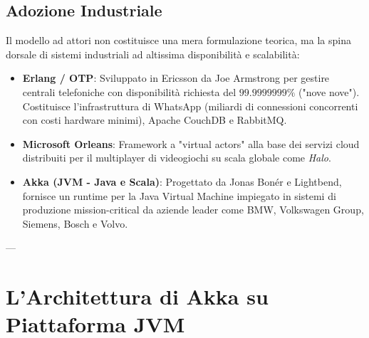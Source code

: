 \subsection{Adozione Industriale}
Il modello ad attori non costituisce una mera formulazione teorica, ma la spina dorsale di sistemi industriali ad altissima disponibilità e scalabilità:
\begin{itemize}
    \item \textbf{Erlang / OTP}: Sviluppato in Ericsson da Joe Armstrong per gestire centrali telefoniche con disponibilità richiesta del $99.9999999\%$ ("nove nove"). Costituisce l'infrastruttura di WhatsApp (miliardi di connessioni concorrenti con costi hardware minimi), Apache CouchDB e RabbitMQ.
    \item \textbf{Microsoft Orleans}: Framework a "virtual actors" alla base dei servizi cloud distribuiti per il multiplayer di videogiochi su scala globale come \textit{Halo}.
    \item \textbf{Akka (JVM - Java e Scala)}: Progettato da Jonas Bonér e Lightbend, fornisce un runtime per la Java Virtual Machine impiegato in sistemi di produzione mission-critical da aziende leader come BMW, Volkswagen Group, Siemens, Bosch e Volvo.
\end{itemize}

---

\section{L'Architettura di Akka su Piattaforma JVM}

